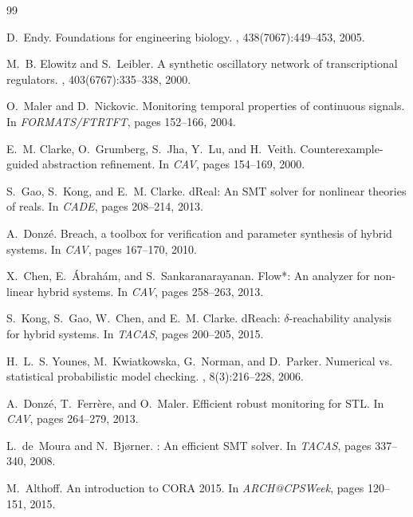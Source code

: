\documentclass[11pt]{article}
\begin{document}
\begin{thebibliography}{99}

D.~Endy.
\newblock Foundations for engineering biology.
, 438(7067):449--453, 2005.

M.~B. Elowitz and S.~Leibler.
\newblock A synthetic oscillatory network of transcriptional regulators.
, 403(6767):335--338, 2000.

O.~Maler and D.~Nickovic.
\newblock Monitoring temporal properties of continuous signals.
\newblock In {\em FORMATS/FTRTFT}, pages 152--166, 2004.

E.~M. Clarke, O.~Grumberg, S.~Jha, Y.~Lu, and H.~Veith.
\newblock Counterexample-guided abstraction refinement.
\newblock In {\em CAV}, pages 154--169, 2000.

S.~Gao, S.~Kong, and E.~M. Clarke.
\newblock d{R}eal: An {SMT} solver for nonlinear theories of reals.
\newblock In {\em CADE}, pages 208--214, 2013.

A.~Donz{\'e}.
\newblock Breach, a toolbox for verification and parameter synthesis of hybrid
  systems.
\newblock In {\em CAV}, pages 167--170, 2010.

X.~Chen, E.~{\'A}brah{\'a}m, and S.~Sankaranarayanan.
\newblock Flow*: An analyzer for non-linear hybrid systems.
\newblock In {\em CAV}, pages 258--263, 2013.

S.~Kong, S.~Gao, W.~Chen, and E.~M. Clarke.
\newblock d{R}each: $\delta$-reachability analysis for hybrid systems.
\newblock In {\em TACAS}, pages 200--205, 2015.

H.~L.~S. Younes, M.~Kwiatkowska, G.~Norman, and D.~Parker.
\newblock Numerical vs. statistical probabilistic model checking.
, 8(3):216--228, 2006.

A.~Donz{\'e}, T.~Ferr{\`e}re, and O.~Maler.
\newblock Efficient robust monitoring for {STL}.
\newblock In {\em CAV}, pages 264--279, 2013.

L.~de~Moura and N.~Bj{\o}rner.
: An efficient {SMT} solver.
\newblock In {\em TACAS}, pages 337--340, 2008.

M.~Althoff.
\newblock An introduction to {CORA} 2015.
\newblock In {\em ARCH@CPSWeek}, pages 120--151, 2015.


\end{thebibliography}
\end{document}
